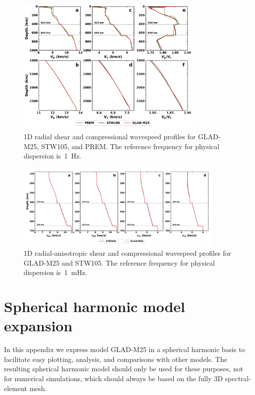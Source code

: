 \documentclass[extra,mreferee]{gji}
\begin{document}
\begin{figure}
  \centering
  \includegraphics[width=0.8\textwidth]{figures/1d_profile.pdf}
  \caption{\small{1D radial shear and compressional wavespeed profiles for GLAD-M25, STW105, and PREM.
  The reference frequency for physical dispersion is~1~Hz.}}
  \label{fig:global-average}
\end{figure}

\begin{figure}
  \centering
  \includegraphics[width=0.9\textwidth]{figures/1d_profile_ra.pdf}
  \caption{\small{1D radial-anisotropic shear and compressional wavespeed profiles for GLAD-M25 and STW105. The reference frequency for physical dispersion is~1~mHz.}}
  \label{fig:global-ra-average}
\end{figure}

\newpage
\section{Spherical harmonic model expansion}
\label{sec:shanalysis}

In this appendix we express model GLAD-M25 in a spherical harmonic basis
to facilitate easy plotting, analysis, and comparisons with other models.
The resulting spherical harmonic model should only be used for these purposes, not for numerical simulations, which should always be based on the fully 3D spectral-element mesh.
\end{document}
